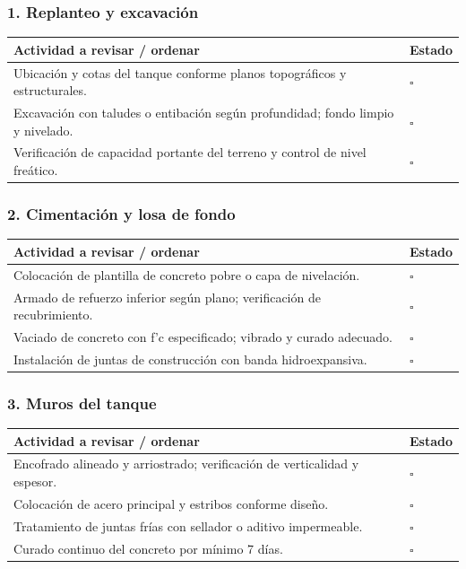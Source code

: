 \documentclass[12pt]{article}
\newcommand{\cbox}{\(\square\)} %
\begin{document}
	\subsubsection*{1. Replanteo y excavación}
	\begin{tabularx}{\linewidth}{>{\raggedright\arraybackslash}p{0.93\linewidth} >{\centering\arraybackslash}m{0.07\linewidth}}
		\toprule
		\textbf{Actividad a revisar / ordenar} & \textbf{Estado}\\
		\midrule
		Ubicación y cotas del tanque conforme planos topográficos y estructurales. & \cbox \\
		Excavación con taludes o entibación según profundidad; fondo limpio y nivelado. & \cbox \\
		Verificación de capacidad portante del terreno y control de nivel freático. & \cbox \\
		\bottomrule
	\end{tabularx}
	
	\subsubsection*{2. Cimentación y losa de fondo}
	\begin{tabularx}{\linewidth}{>{\raggedright\arraybackslash}p{0.93\linewidth} >{\centering\arraybackslash}m{0.07\linewidth}}
		\toprule
		\textbf{Actividad a revisar / ordenar} & \textbf{Estado}\\
		\midrule
		Colocación de plantilla de concreto pobre o capa de nivelación. & \cbox \\
		Armado de refuerzo inferior según plano; verificación de recubrimiento. & \cbox \\
		Vaciado de concreto con f’c especificado; vibrado y curado adecuado. & \cbox \\
		Instalación de juntas de construcción con banda hidroexpansiva. & \cbox \\
		\bottomrule
	\end{tabularx}
	
	\subsubsection*{3. Muros del tanque}
	\begin{tabularx}{\linewidth}{>{\raggedright\arraybackslash}p{0.93\linewidth} >{\centering\arraybackslash}m{0.07\linewidth}}
		\toprule
		\textbf{Actividad a revisar / ordenar} & \textbf{Estado}\\
		\midrule
		Encofrado alineado y arriostrado; verificación de verticalidad y espesor. & \cbox \\
		Colocación de acero principal y estribos conforme diseño. & \cbox \\
		Tratamiento de juntas frías con sellador o aditivo impermeable. & \cbox \\
		Curado continuo del concreto por mínimo 7 días. & \cbox \\
		\bottomrule
	\end{tabularx}
	
\end{document}
